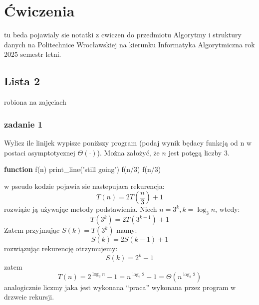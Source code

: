 \documentclass[11pt,a4paper]{article}
\begin{document}
\begin{center}\end{center}


\pagebreak
\section{Ćwiczenia}
tu beda pojawialy sie notatki z cwiczen do przedmiotu Algorytmy i struktury danych na Politechnice Wrocławskiej na kierunku Informatyka Algorytmiczna rok 2025 semestr letni.

\subsection{Lista 2}
robiona na zajęciach \date{2025-03-10}
\subsubsection{zadanie 1}
Wylicz ile linijek wypisze poniższy program (podaj wynik będacy funkcją od n w postaci asymptotycznej $\Theta(\cdot)$). Można założyć, że $n$ jest potęgą liczby $3$.
\begin{algorithm}
\begin{algorithmic}[1]
\State \textbf{function} f(n)
    \State print\_line('still going')
    \State f(n/3)
    \State f(n/3)
\EndIf
\end{algorithmic}
\end{algorithm}
w pseudo kodzie pojawia sie nastepujaca rekurencja:
\[
    T(n) = 2T(\frac{n}{3}) + 1
\]
rozwiąże ją używając metody podstawienia. Niech $n=3^k, k = \log_3 n$, wtedy:
\[
    T(3^k) = 2T(3^{k-1}) + 1
\]
Zatem przyjmując $S(k) = T(3^k)$ mamy:
\[
    S(k) = 2S(k-1) + 1
\]
rozwiązując rekurencję otrzymujemy:
\[
    S(k) = 2^k - 1
\]
zatem
\[
    T(n) = 2^{\log_3 n} - 1 = n^{\log_3 2} - 1 = \Theta(n^{\log_3 2})
\]
analogicznie liczmy jaka jest wykonana ``praca'' wykonana przez program w drzweie rekursji.
\end{document}
